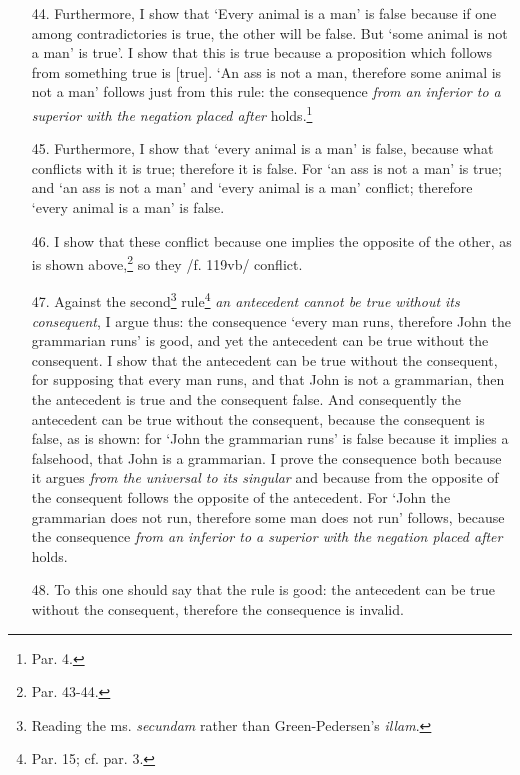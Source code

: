 \begin{enumerate}
\item[44.] Furthermore, I show that `Every animal is a man' is false because if one among contradictories is true, the other will be false. But `some animal is not a man' is true'. I show that this is true because a proposition which follows from something true is [true]. `An ass is not a man, therefore some animal is not a man' follows just from this rule: the consequence \textit{from an inferior to a superior with the negation placed after} holds.\footnote{Par. 4.}
\item[45.] Furthermore, I show that `every animal is a man' is false, because what conflicts with it is true; therefore it is false. For `an ass is not a man' is true; and `an ass is not a man' and `every animal is a man' conflict; therefore `every animal is a man' is false.
\item[46.] I show that these conflict because one implies the opposite of the other, as is shown above,\footnote{Par. 43-44.} so they /f. 119vb/ conflict.
\item[47.] Against the second\footnote{Reading the ms. \textit{secundam} rather than Green-Pedersen's \textit{illam}.} rule\footnote{Par. 15; cf. par. 3.} \textit{an antecedent cannot be true without its consequent}, I argue thus: the consequence `every man runs, therefore John the grammarian runs' is good, and yet the antecedent can be true without the consequent. I show that the antecedent can be true without the consequent, for supposing that every man runs, and that John is not a grammarian, then the antecedent is true and the consequent false. And consequently the antecedent can be true without the consequent, because the consequent is false, as is shown: for `John the grammarian runs' is false because it implies a falsehood, that John is a grammarian. I prove the consequence both because it argues \textit{from the universal to its singular} and because from the opposite of the consequent follows the opposite of the antecedent. For `John the grammarian does not run, therefore some man does not run' follows, because the  consequence \textit{from an inferior to a superior with the negation placed after} holds. 
\item[48.] To this one should say that the rule is good: the antecedent can be true without the consequent, therefore the consequence is invalid.


\end{enumerate}

